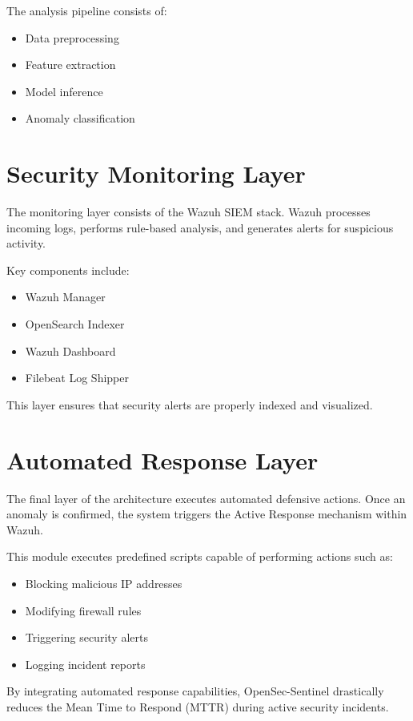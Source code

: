 \documentclass[12pt, a4paper]{report}
\begin{document}
	The analysis pipeline consists of:
	
	\begin{itemize}
		\item Data preprocessing
		\item Feature extraction
		\item Model inference
		\item Anomaly classification
	\end{itemize}
	
	\section{Security Monitoring Layer}
	
	The monitoring layer consists of the Wazuh SIEM stack. Wazuh processes incoming
	logs, performs rule-based analysis, and generates alerts for suspicious
	activity.
	
	Key components include:
	
	\begin{itemize}
		\item Wazuh Manager
		\item OpenSearch Indexer
		\item Wazuh Dashboard
		\item Filebeat Log Shipper
	\end{itemize}
	
	This layer ensures that security alerts are properly indexed and visualized.
	
	\section{Automated Response Layer}
	
	The final layer of the architecture executes automated defensive actions.
	Once an anomaly is confirmed, the system triggers the Active Response
	mechanism within Wazuh.
	
	This module executes predefined scripts capable of performing actions such as:
	
	\begin{itemize}
		\item Blocking malicious IP addresses
		\item Modifying firewall rules
		\item Triggering security alerts
		\item Logging incident reports
	\end{itemize}
	
	By integrating automated response capabilities, OpenSec-Sentinel drastically
	reduces the Mean Time to Respond (MTTR) during active security incidents.
	
\end{document}
